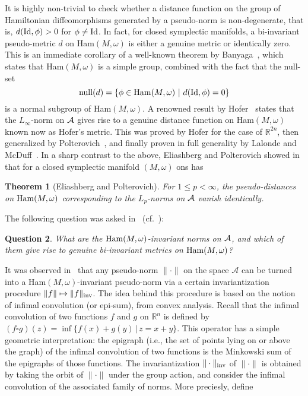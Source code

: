 \documentclass{icmart}
\newtheorem{theorem}{Theorem}[section]
\newtheorem{question}[theorem]{Question}
\theoremstyle{definition}
\begin{document}
It is highly non-trivial to check whether a distance function on the group of Hamiltonian diffeomorphisms 
generated by  a pseudo-norm is non-degenerate, that is, $d({\rm Id},\phi)
> 0$ for $\phi \neq {\rm Id}$. In fact, for closed
symplectic manifolds, a bi-invariant pseudo-metric $d$ on
Ham$(M,\omega)$ is either a genuine metric or identically zero. This
is an immediate corollary of a well-known theorem by
Banyaga~\cite{B}, which states that Ham$(M,\omega)$ is a simple
group, combined with the fact that the null-set $${\rm null}(d) = \{
\phi \in {\rm Ham}(M,\omega) \ | \ d({\rm Id},\phi) = 0 \}$$ is a normal
subgroup of Ham$(M,\omega)$. A  renowned result by
Hofer~\cite{H} states that the $L_{\infty}$-norm on ${\cal A}$ gives
rise to a genuine distance function on Ham$(M,\omega)$ known now as
Hofer's metric. This was  proved by Hofer for the case
of ${\mathbb R}^{2n}$, then generalized by Polterovich~\cite{P}, and
finally proven in full generality by Lalonde and McDuff~\cite{LM}.
In a sharp contrast to the above, Eliashberg and
Polterovich showed in~\cite{EliP} that for a closed symplectic manifold $(M,\omega)$ ons has
\begin{theorem}[Eliashberg and Polterovich]
For $1 \leq p < \infty$,  the
pseudo-distances on ${\rm Ham}(M,\omega)$ corresponding to the
$L_p$-norms on ${\cal A}$ vanish identically.
\end{theorem}

The following question was asked in~\cite{EliP} (cf.~\cite{Eli,P1}):

\begin{question} \label{Ques:inv-norms} What are the ${\rm Ham}(M,\omega)$-invariant norms on ${\cal
A}$, and which of them give rise to genuine bi-invariant metrics
on ${\rm Ham}(M,\omega)$?
\end{question}

It was observed in~\cite{BO} that  any pseudo-norm $\| \cdot \|$ 
on the space ${\mathcal A}$ can be turned into a Ham$(M,\omega)$-invariant pseudo-norm via a certain 
invariantization procedure $ \| f \| \mapsto \| f \|_{\rm inv}$. 
The idea behind this procedure is based on the notion of infimal convolution (or epi-sum), from convex analysis. 
Recall that the infimal convolution of two functions $f$ and $g$ on ${\mathbb R}^n$ is defined by $(f \square g)(z)  = \inf \{ f(x)+g(y) \, | \, z=x+y\}$. 
This operator has a simple geometric interpretation: the epigraph (i.e., the set of points lying on or above the graph) of the infimal convolution of two functions is the Minkowski sum of the epigraphs of those functions. 
The invariantization $\| \cdot \|_{\rm inv}$  of $\| \cdot \|$ is obtained by taking the orbit of $\|  \cdot \|$ under the group action, and consider the infimal convolution of the associated family of norms. More preciesly, define
\end{document}
